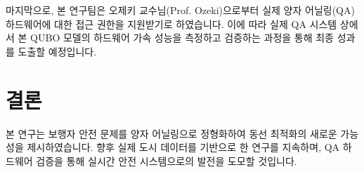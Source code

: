 \documentclass[11pt,a4paper]{article}
\begin{document}
마지막으로, 본 연구팀은 오제키 교수님(Prof. Ozeki)으로부터 실제 양자 어닐링(QA) 하드웨어에 대한 접근 권한을 지원받기로 하였습니다. 이에 따라 실제 QA 시스템 상에서 본 QUBO 모델의 하드웨어 가속 성능을 측정하고 검증하는 과정을 통해 최종 성과를 도출할 예정입니다.

\section{결론}
본 연구는 보행자 안전 문제를 양자 어닐링으로 정형화하여 동선 최적화의 새로운 가능성을 제시하였습니다. 향후 실제 도시 데이터를 기반으로 한 연구를 지속하며, QA 하드웨어 검증을 통해 실시간 안전 시스템으로의 발전을 도모할 것입니다.



\end{document}
